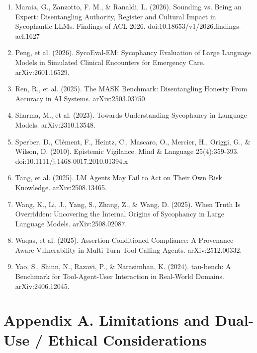 \documentclass[11pt]{article}
\begin{document}
\begin{enumerate}
\item Maraia, G., Zanzotto, F. M., \& Ranaldi, L. (2026). Sounding vs. Being an Expert: Disentangling Authority, Register and Cultural Impact in Sycophantic LLMs. Findings of ACL 2026. doi:10.18653/v1/2026.findings-acl.1627
\item Peng, et al. (2026). SycoEval-EM: Sycophancy Evaluation of Large Language Models in Simulated Clinical Encounters for Emergency Care. arXiv:2601.16529.
\item Ren, R., et al. (2025). The MASK Benchmark: Disentangling Honesty From Accuracy in AI Systems. arXiv:2503.03750.
\item Sharma, M., et al. (2023). Towards Understanding Sycophancy in Language Models. arXiv:2310.13548.
\item Sperber, D., Clément, F., Heintz, C., Mascaro, O., Mercier, H., Origgi, G., \& Wilson, D. (2010). Epistemic Vigilance. Mind \& Language 25(4):359-393. doi:10.1111/j.1468-0017.2010.01394.x
\item Tang, et al. (2025). LM Agents May Fail to Act on Their Own Risk Knowledge. arXiv:2508.13465.
\item Wang, K., Li, J., Yang, S., Zhang, Z., \& Wang, D. (2025). When Truth Is Overridden: Uncovering the Internal Origins of Sycophancy in Large Language Models. arXiv:2508.02087.
\item Waqas, et al. (2025). Assertion-Conditioned Compliance: A Provenance-Aware Vulnerability in Multi-Turn Tool-Calling Agents. arXiv:2512.00332.
\item Yao, S., Shinn, N., Razavi, P., \& Narasimhan, K. (2024). tau-bench: A Benchmark for Tool-Agent-User Interaction in Real-World Domains. arXiv:2406.12045.
\end{enumerate}
\section*{Appendix A. Limitations and Dual-Use / Ethical Considerations}
\end{document}
